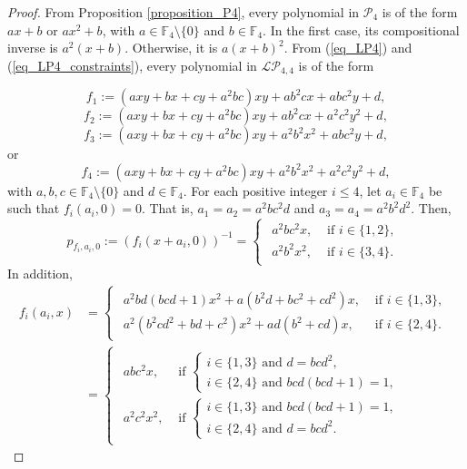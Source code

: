 \documentclass[10pt,a4paper]{amsart}
\begin{document}
\begin{proof} From Proposition \ref{proposition_P4}, every polynomial in $\mathcal{P}_4$ is of the form  $ax+b$ or $ax^2+b$, with $a\in\mathbb{F}_4\setminus\{0\}$ and $b\in\mathbb{F}_4$. In the first case, its compositional inverse is $a^2(x+b)$. Otherwise, it is $a(x+b)^2$. From (\ref{eq_LP4}) and (\ref{eq_LP4_constraints}), every polynomial in $\mathcal{LP}_{4,4}$ is of the form

\[f_1:=\left(axy+bx+cy+a^2bc\right)xy+ab^2cx+abc^2y+d,\]
\[f_2:=\left(axy+bx+cy+a^2bc\right)xy+ab^2cx+a^2c^2y^2+d,\]
\[f_3:=\left(axy+bx+cy+a^2bc\right)xy+a^2b^2x^2+abc^2y+d,\]
or
\[f_4:=\left(axy+bx+cy+a^2bc\right)xy+a^2b^2x^2+a^2c^2y^2+d,\]
with $a,b,c\in\mathbb{F}_4\setminus\{0\}$ and $d\in\mathbb{F}_4$. For each positive integer $i\leq 4$, let $a_i\in\mathbb{F}_4$ be such that $f_i(a_i,0)=0$. That is, $a_1=a_2=a^2bc^2d$ and $a_3=a_4=a^2b^2d^2$. Then,
\[p_{f_i,a_i,0}:=\left(f_i(x+a_i,0)\right)^{-1}=\begin{cases}
    \begin{array}{ll}
    a^2bc^2x, & \text{ if } i\in\{1,2\},\\
    a^2b^2x^2, & \text{ if } i\in\{3,4\}.   
    \end{array}
\end{cases}\]
In addition,
\begin{align*}f_i(a_i,x) & =\begin{cases}
    \begin{array}{ll}
    a^2bd(bcd+1)x^2+a(b^2d+bc^2+cd^2)x, & \text{ if } i\in\{1,3\},\\
    a^2(b^2cd^2+bd+c^2)x^2+ad(b^2+cd)x
, & \text{ if } i\in\{2,4\}.
    \end{array}
\end{cases}\\
& = \begin{cases}\begin{array}{ll}
    abc^2x, & \text{ if } \begin{cases}i\in\{1,3\} \text{ and } d=bcd^2,\\
    i\in\{2,4\} \text{ and } bcd(bcd+1)=1,
    \end{cases}\\
    a^2c^2x^2, & \text{ if } \begin{cases}
     i\in\{1,3\} \text{ and } bcd(bcd+1)=1,\\
     i\in\{2,4\} \text{ and } d=bcd^2.
    \end{cases}
    \end{array}
    \end{cases}

\end{align*}
\end{proof}
\end{document}

